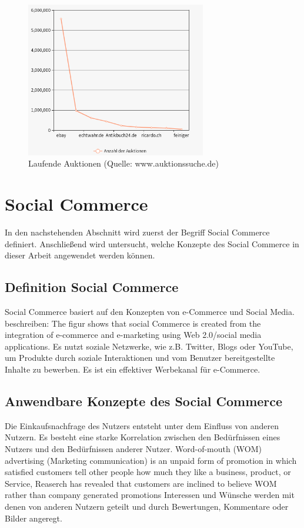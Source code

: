 \begin{figure}
	\centering
	\includegraphics[width=0.7\textwidth]{bilder/laufende-auktionen.png}
	\caption[Laufende Auktionen]{Laufende Auktionen (Quelle: www.auktionssuche.de)}
	\label{fig:laufende-auktionen}
\end{figure}


\section{Social Commerce}

In den nachstehenden Abschnitt wird zuerst der Begriff Social Commerce definiert. Anschließend wird untersucht, welche Konzepte des Social Commerce in dieser Arbeit angewendet werden können.


\subsection{Definition Social Commerce}

Social Commerce basiert auf den Konzepten von e-Commerce und Social Media. \textcite[S. 8]{turban:sc} beschreiben: \glqq{}The figur shows that social Commerce is created from the integration of e-commerce and e-marketing using  Web 2.0/social media applications.\grqq{} Es nutzt soziale Netzwerke, wie z.B. Twitter, Blogs oder YouTube, um Produkte durch soziale Interaktionen und vom Benutzer bereitgestellte Inhalte zu bewerben. Es ist ein effektiver Werbekanal für e-Commerce.


\subsection{Anwendbare Konzepte des Social Commerce}

Die Einkaufsnachfrage des Nutzers entsteht unter dem Einfluss von anderen Nutzern. Es besteht eine starke Korrelation zwischen den Bedürfnissen eines Nutzers und den Bedürfnissen anderer Nutzer. Word-of-mouth (WOM) advertising (Marketing communication) is \glqq{}an unpaid form of promotion in which satisfied customers tell other people how much they like a business, product, or Service\grqq{}, \glqq{}Reaserch has revealed that customers are inclined to believe WOM rather than company generated promotions\grqq{} \parencite[S. 58]{turban:sc} Interessen und Wünsche werden mit denen von anderen Nutzern geteilt und durch Bewertungen, Kommentare oder Bilder angeregt.


